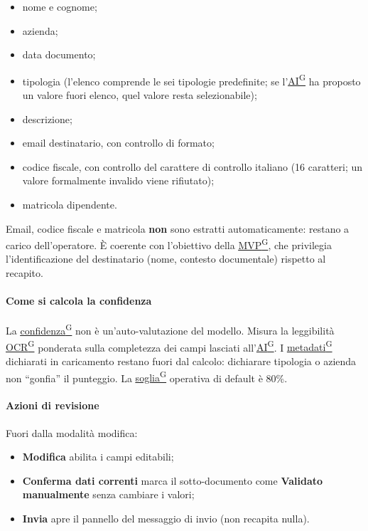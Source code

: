 \documentclass[a4paper,12pt]{article}
\providecommand{\glslink}[2]{\href{https://alittlebyte-19.github.io/Documentazione/glossario.html\#gls-#1}{\underline{#2}\textsuperscript{\scriptsize G}}}
\newcommand{\ui}[1]{\textbf{\textsf{#1}}}
\begin{document}
\begin{itemize}
    \item nome e cognome;
    \item azienda;
    \item data documento;
    \item tipologia (l'elenco comprende le sei tipologie predefinite; se l'\glslink{intelligenza-artificiale-ai}{AI} ha proposto un valore fuori elenco, quel valore resta selezionabile);
    \item descrizione;
    \item email destinatario, con controllo di formato;
    \item codice fiscale, con controllo del carattere di controllo italiano (16 caratteri; un valore formalmente invalido viene rifiutato);
    \item matricola dipendente.
\end{itemize}

Email, codice fiscale e matricola \textbf{non} sono estratti automaticamente: restano a carico dell'operatore. È coerente con l'obiettivo della \glslink{mvp-minimum-viable-product}{MVP}, che privilegia l'identificazione del destinatario (nome, contesto documentale) rispetto al recapito.

\paragraph{Come si calcola la confidenza}

La \glslink{confidenza-confidence-score}{confidenza} non è un'auto-valutazione del modello. Misura la leggibilità \glslink{ocr-riconoscimento-ottico-dei-caratteri}{OCR} ponderata sulla completezza dei campi lasciati all'\glslink{intelligenza-artificiale-ai}{AI}. I \glslink{metadati}{metadati} dichiarati in caricamento restano fuori dal calcolo: dichiarare tipologia o azienda non ``gonfia'' il punteggio. La \glslink{soglia-di-confidenza}{soglia} operativa di default è 80\%.

\paragraph{Azioni di revisione}

Fuori dalla modalità modifica:

\begin{itemize}
    \item \ui{Modifica} abilita i campi editabili;
    \item \ui{Conferma dati correnti} marca il sotto-documento come \ui{Validato manualmente} senza cambiare i valori;
    \item \ui{Invia} apre il pannello del messaggio di invio (non recapita nulla).
\end{itemize}
\end{document}
